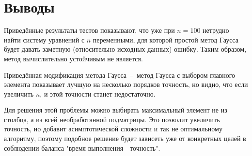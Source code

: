 \newpage
\section{Выводы}
Приведённые результаты тестов показывают, что уже при $n = 100$ нетрудно найти систему уравнений с $n$ переменными,
для которой простой метод Гаусса будет давать заметную (относительно исходных данных) ошибку.
Таким образом, метод вычислительно устойчивым не является.
\par

Приведённая модификация метода Гаусса~--~метод Гаусса с выбором главного элемента показывает лучшую на несколько порядков точность,
но видно, что если увеличить $n$, и этой точности станет недостаточно.
\par

Для решения этой проблемы можно выбирать максимальный элемент не из столбца, а из всей необработанной подматрицы.
Это позволит увеличить точность, но добавит асимптотической сложности и так не оптимальному алгоритму, поэтому подобное решение
будет зависеть уже от конкретных целей в соблюдении баланса "время выполнения - точность".
